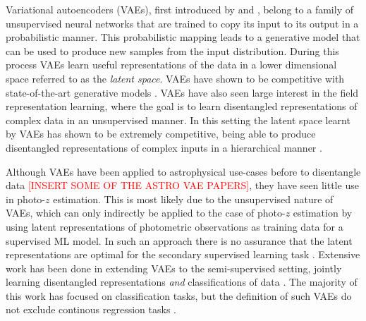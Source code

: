 Variational autoencoders (VAEs), first introduced by \cite{kingmaAutoEncodingVariationalBayes2022} and \cite{rezendeStochasticBackpropagationApproximate2014}, belong to a family of unsupervised neural networks that are trained to copy its input to its output in a probabilistic manner. This probabilistic mapping leads to a generative model that can be used to produce new samples from the input distribution. 
During this process VAEs learn useful representations of the data in a lower dimensional space referred to as the \textit{latent space}. VAEs have shown to be competitive with state-of-the-art generative models \citep{childVeryDeepVAEs2021, vahdatNVAEDeepHierarchical2021, maaloeBIVAVeryDeep2019}. VAEs have also seen large interest in the field representation learning, where the goal is to learn disentangled representations of complex data in an unsupervised manner.
In this setting the latent space learnt by VAEs has shown to be extremely competitive, being able to produce disentangled representations of complex inputs in a hierarchical manner \citep{siddharthLearningDisentangledRepresentations2017}. 

Although VAEs have been applied to astrophysical use-cases before to disentangle data \textcolor{red}{[INSERT SOME OF THE ASTRO VAE PAPERS]}, they have seen little use in photo-$z$ estimation. This is most likely due to the unsupervised nature of VAEs, which can only indirectly be applied to the case of photo-$z$ estimation by using latent representations of photometric observations as training data for a supervised ML model. In such an approach there is no assurance that the latent representations are optimal for the secondary supervised learning task \citep{kingmaSemiSupervisedLearningDeep2014}. Extensive work has been done in extending VAEs to the semi-supervised setting, jointly learning disentangled representations \textit{and} classifications of data \citep{kingmaSemiSupervisedLearningDeep2014, maaloeAuxiliaryDeepGenerative2016, maaloeBIVAVeryDeep2019}. The majority of this work has focused on classification tasks, but the definition of such VAEs do not exclude continous regression tasks \citep{maaloeAuxiliaryDeepGenerative2016}.

